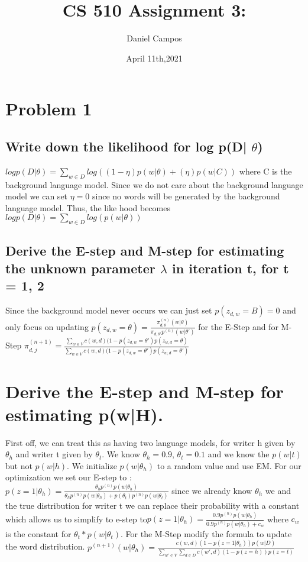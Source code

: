 \documentclass[11pt]{article}
\title{CS 510 Assignment 3:}
\author{Daniel Campos}
\date{April 11th,2021}
\begin{document}
\maketitle
\section{Problem 1}
\subsection{Write down the likelihood for log p(D| $\theta$) }
$log p(D | \theta)= \sum_{w \in D} log((1-\eta) p(w|\theta) +  (\eta) p(w|C))$ where C is the background language model. Since we do not care about the background language model we can set $\eta=0$ since no words will be generated by the background language model. Thus, the like hood becomes $log p(D| \theta) = \sum_{w \in D} log(p(w|\theta))$
\subsection{Derive the E-step and M-step for estimating the unknown parameter $\lambda$ in iteration t, for t = 1, 2}
Since the background model never occurs we can just set $p(z_{d,w}=B) = 0$ and only focus on updating $p(z_{d,w}=\theta) =\frac{\pi_{d, \theta}^(n) (w| \theta)}{\pi_{d,\theta'} p^(n) (w|\theta')}$ for the E-Step and for M-Step $\pi_{d,j}^(n+1)= \frac{\sum_{w \in V} c(w,d)(1-p(z_{d,w} = \theta')p(z_{w, d} = \theta)}{\sum_{w \in V} c(w,d)(1-p(z_{d,w} = \theta')p(z_{w, d} = \theta')}$
\section{Derive the E-step and M-step for estimating p(w|H).}
First off, we can treat this as having two language models, for writer h given by $\theta_h$ and writer t given by $\theta_t$. We know $\theta_h=0.9$, $\theta_t=0.1$ and we know the $p(w| t)$ but not $p(w|h)$. We initialize $p(w | \theta_h)$ to a random value and use EM. For our optimization we set our E-step to : \\
$p(z = 1| \theta_h) = \frac{\theta_h p^{(n)} p(w| \theta_h)}{\theta_h p^{(n)} p(w| \theta_h) + p(\theta_t) p^{(n)} p(w| \theta_t)}$
since we already know $\theta_h$ we and the true distribution for writer t we can replace their probability with a constant which allows us to simplify to e-step to$p(z = 1| \theta_h) = \frac{0.9p^{(n)} p(w| \theta_h)}{0.9p^{(n)} p(w| \theta_h) + c_w}$ where $c_w$ is the constant for $\theta_t*p(w|\theta_t)$.
For the M-Step modify the formula to update the word distribution. $p^(n+1) (w| \theta_h) = \frac{c(w,d)(1-p(z=1|\theta_h))p(w|D)}{\sum_{w' \in V} \sum_{d \in D} c(w',d)(1-p(z=h))p(z=t)}$
\end{document}
